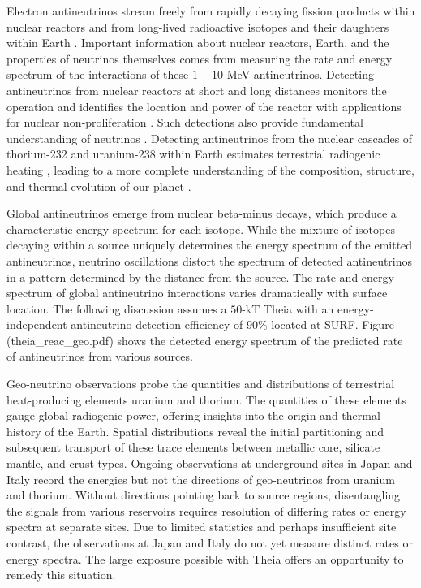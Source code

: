 Electron antineutrinos stream freely from rapidly decaying fission products within nuclear reactors and from long-lived radioactive isotopes and their daughters within Earth \cite{agm15}. Important information about nuclear reactors, Earth, and the properties of neutrinos themselves comes from measuring the rate and energy spectrum of the interactions of these $1-10$ MeV antineutrinos. Detecting antineutrinos from nuclear reactors at short \cite{nucifer15,songs07} and long \cite{nudar13,snif10} distances monitors the operation and identifies the location and power of the reactor with applications for nuclear non-proliferation \cite{adam10}. Such detections also provide fundamental understanding of neutrinos \cite{reines53,reines76,jgl08}. Detecting antineutrinos from the nuclear cascades of thorium-232 and uranium-238 within Earth \cite{kl05} estimates terrestrial radiogenic heating \cite{gando13,agostini15}, leading to a more complete understanding of the composition, structure, and thermal evolution of our planet \cite{dye_etal15}. 

Global antineutrinos emerge from nuclear beta-minus decays, which produce a characteristic energy spectrum for each isotope. While the mixture of isotopes decaying within a source uniquely determines the energy spectrum of the emitted antineutrinos, neutrino oscillations distort the spectrum of detected antineutrinos in a pattern determined by the distance from the source. The rate and energy spectrum of global antineutrino interactions varies dramatically with surface location. The following discussion assumes a $50$-kT Theia with an energy-independent antineutrino detection efficiency of $90$\% located at SURF. Figure (theia_reac_geo.pdf) shows the detected energy spectrum of the predicted rate of antineutrinos from various sources.

Geo-neutrino observations probe the quantities and distributions of terrestrial heat-producing elements uranium and thorium. The quantities of these elements gauge global radiogenic power, offering insights into the origin and thermal history of the Earth. Spatial distributions reveal the initial partitioning and subsequent transport of these trace elements between metallic core, silicate mantle, and crust types. Ongoing observations at underground sites in Japan and Italy record the energies but not the directions of geo-neutrinos from uranium and thorium. Without directions pointing back to source regions, disentangling the signals from various reservoirs requires resolution of differing rates or energy spectra at separate sites. Due to limited statistics and perhaps insufficient site contrast, the observations at Japan and Italy do not yet measure distinct rates or energy spectra. The large exposure possible with Theia offers an opportunity to remedy this situation.

